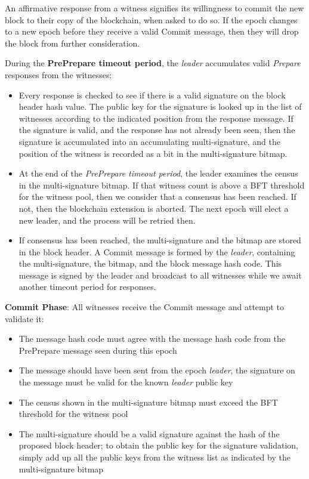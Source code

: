 \documentclass[8pt,fleqn,openany]{book}
\begin{document}
\begin{itemize}
{  \item{An affirmative response from a witness signifies its willingness to commit the new block to their copy of the blockchain, when asked to do so. If the epoch changes to a new epoch before they receive a valid Commit message, then they will drop the block from further consideration.} 

  \item{During the \textbf{PrePrepare timeout period}, the \textit{leader} accumulates valid \textit{Prepare} responses from the witnesses:

    \begin{itemize}
      \item {Every response is checked to see if there is a valid signature on the block header hash value. The public key for the signature is looked up in the list of witnesses according to the indicated position from the response message. If the signature is valid, and the response has not already been seen, then the signature is accumulated into an accumulating multi-signature, and the position of the witness is recorded as a bit in the multi-signature bitmap.} 

      \item {At the end of the \textit{PrePrepare timeout period}, the leader examines the census in the multi-signature bitmap. If that witness count is above a BFT threshold for the witness pool, then we consider that a consensus has been reached. If not, then the blockchain extension is aborted. The next epoch will elect a new leader, and the process will be retried then.}

      \item {If consensus has been reached, the multi-signature and the bitmap are stored in the block header. A Commit message is formed by the \textit{leader}, containing the multi-signature, the bitmap, and the block message hash code. This message is signed by the leader and broadcast to all witnesses while we await another timeout period for responses.}
    \end{itemize}}

  \item {\textbf{Commit Phase}: All witnesses receive the Commit message and attempt to validate it:

    \begin{itemize}
      \item {The message hash code must agree with the message hash code from the PrePrepare message seen during this epoch}
    \item{The message should have been sent from the epoch \textit{leader}, the signature on the message must be valid for the known \textit{leader} public key}
      \item{The census shown in the multi-signature bitmap must exceed the BFT threshold for the witness pool}
      \item{The multi-signature should be a valid signature against the hash of the proposed block header; to obtain the public key for the signature validation, simply add up all the public keys from the witness list as indicated by the multi-signature bitmap}
    \end{itemize}

}}
\end{itemize}
\end{document}
